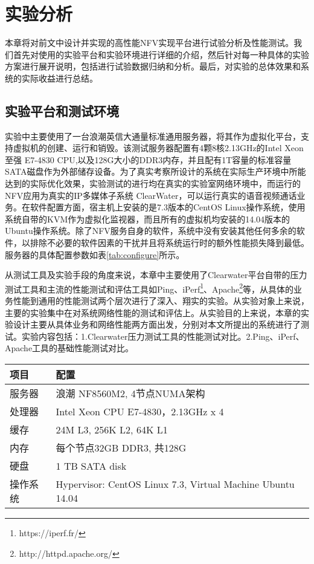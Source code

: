\chapter{实验分析}
\label{chapter:evaluation}
本章将对前文中设计并实现的高性能NFV实现平台进行试验分析及性能测试。我们首先对使用的实验平台和实验环境进行详细的介绍，然后针对每一种具体的实验方案进行展开说明，包括进行试验数据归纳和分析。最后，对实验的总体效果和系统的实际收益进行总结。

\section{实验平台和测试环境}
实验中主要使用了一台浪潮英信大通量标准通用服务器，将其作为虚拟化平台，支持虚拟机的创建、运行和销毁。该测试服务器配置有4颗8核2.13GHz的Intel Xeon至强 E7-4830 CPU,以及128G大小的DDR3内存，并且配有1T容量的标准容量SATA磁盘作为外部储存设备。为了真实考察所设计的系统在实际生产环境中所能达到的实际优化效果，实验测试的进行均在真实的实验室网络环境中，而运行的NFV应用为真实的IP多媒体子系统 ClearWater，可以运行真实的语音视频通话业务。在软件配置方面，宿主机上安装的是7.3版本的CentOS Linux操作系统，使用系统自带的KVM作为虚拟化监视器，而且所有的虚拟机均安装的14.04版本的Ubuntu操作系统。除了NFV服务自身的软件，系统中没有安装其他任何多余的软件，以排除不必要的软件因素的干扰并且将系统运行时的额外性能损失降到最低。服务器的具体配置参数如表\ref{tab:configure}所示。

从测试工具及实验手段的角度来说，本章中主要使用了Clearwater平台自带的压力测试工具和主流的性能测试和评估工具如Ping、iPerf\footnote{https://iperf.fr/}、Apache\footnote{http://httpd.apache.org/}等，从具体的业务性能到通用的性能测试两个层次进行了深入、翔实的实验。从实验对象上来说，主要的实验集中在对系统网络性能的测试和评估上。从实验目的上来说，本章的实验设计主要从具体业务和网络性能两方面出发，分别对本文所提出的系统进行了测试。实验内容包括：1.Clearwater压力测试工具的性能测试对比。2.Ping、iPerf、Apache工具的基础性能测试对比。

\begin{table}[htb]
	\centering
	\begin{tabular}{ | l | p{6cm} |}\hline
		\textbf{项目} &							 \textbf{配置}  				\\ 	\hline
		服务器        &					 浪潮 NF8560M2, 4节点NUMA架构\\ \hline
		处理器 	   &  Intel Xeon CPU E7-4830，2.13GHz x 4  \\ \hline
		缓存    & 24M L3, 256K L2,  64K L1 \\ \hline
		内存 			&  每个节点32GB DDR3,  共128G   \\   \hline
		硬盘     & 				1 TB SATA disk \\ \hline
		操作系统    & Hypervisor: CentOS Linux 7.3,  Virtual Machine Ubuntu 14.04 \\ \hline
	\end{tabular}
\end{table}

